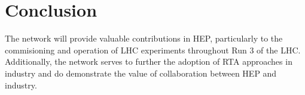 \section{Conclusion}
\label{conclusion}
The network will provide valuable contributions in HEP, particularly to the commisioning and operation of LHC experiments throughout Run 3 of the LHC. Additionally, the network serves to further the adoption of RTA approaches in industry and do demonstrate the value of collaboration between HEP and industry.